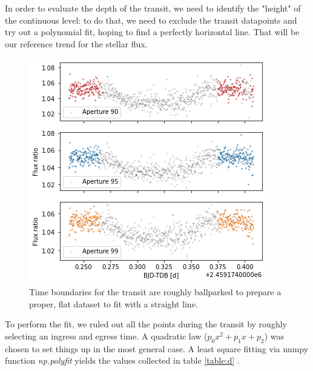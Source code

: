 \documentclass[a4paper,11pt,twocolumn]{article}
\begin{document}
In order to evaluate the depth of the transit, we need to identify the "height" 
of the continuous level: to do that, we need to exclude the transit datapoints 
and try out a polynomial fit, hoping to find a perfectly horizontal line. That 
will be our reference trend for the stellar flux.
\begin{figure}
    \centering  
    \includegraphics[scale=0.5, angle=0]{../pictures/taste/fit_setting.png}
    \caption{Time boundaries for the transit are roughly ballparked to 
    prepare a proper, flat dataset to fit with a straight line.}
    \label{fig:fit_setting}
\end{figure}
To perform the fit, we ruled out all the points during the transit by roughly 
selecting an ingress and egress time. A quadratic law ($p_0 x^2 + p_1 x +p_2$)
was chosen to set things up in the most general case. A least square fitting 
via numpy function \textit{np.polyfit} yields the values collected in table \ref{table:d} .
\end{document}
